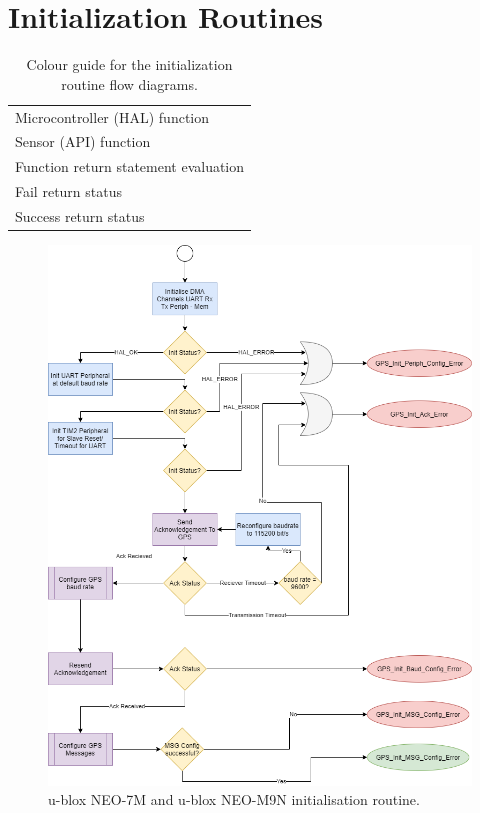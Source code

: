 \section{Initialization Routines}

\begin{table}[H]
	\centering
	\caption{Colour guide for the initialization routine flow diagrams.}
	\begin{tabular}{l}
		\hline
		\cellcolor{micro}Microcontroller (HAL) function \\
		\cellcolor{sensor}Sensor (API) function \\
		\cellcolor{conditional}Function return statement evaluation \\
		\cellcolor{wrong}Fail return status \\
		\cellcolor{succ}Success return status\\
		\hline
	\end{tabular}
	
	\label{tab:Init_routine_Guide}
\end{table}


\begin{figure}[H]
	\centering
	\includegraphics[scale=0.3]{GPS Initialization Algorithm .png}
	\caption{u-blox NEO-7M and u-blox NEO-M9N initialisation routine.}
	\label{fig:Init_diagram_gps}
\end{figure}

